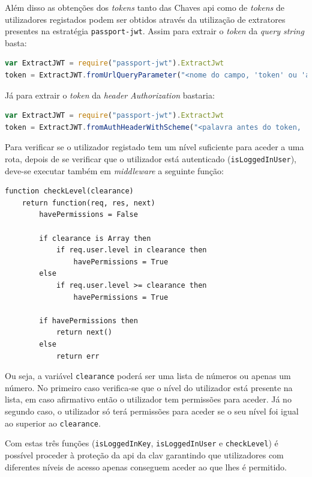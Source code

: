 Além disso as obtenções dos \textit{tokens} tanto das Chaves \acrshort{api} como de \textit{tokens} de utilizadores registados podem ser obtidos através da utilização de extratores presentes na estratégia \texttt{passport-jwt}. Assim para extrair o \textit{token} da \textit{query string} basta:
\begin{lstlisting}[language=javascript, caption=Extração do \textit{token} da \textit{query string}]
var ExtractJWT = require("passport-jwt").ExtractJwt
token = ExtractJWT.fromUrlQueryParameter("<nome do campo, 'token' ou 'apikey' no caso da CLAV>")
\end{lstlisting}
Já para extrair o \textit{token} da \textit{header} \textit{Authorization} bastaria:
\begin{lstlisting}[language=javascript, caption=Extração do \textit{token} da \textit{heaer} \textit{Authorization}]
var ExtractJWT = require("passport-jwt").ExtractJwt
token = ExtractJWT.fromAuthHeaderWithScheme("<palavra antes do token, 'Bearer' no caso dum bearer token, 'token' ou 'apikey' no caso da CLAV>")
\end{lstlisting}

Para verificar se o utilizador registado tem um nível suficiente para aceder a uma rota, depois de se verificar que o utilizador está autenticado (\texttt{isLoggedInUser}), deve-se executar também em \textit{middleware} a seguinte função:
\begin{lstlisting}[language=pseudocode, caption=Verificação se um utilizador registado tem permissões suficientes para aceder a uma determinada rota]
function checkLevel(clearance)
    return function(req, res, next)
        havePermissions = False

        if clearance is Array then
            if req.user.level in clearance then
                havePermissions = True
        else
            if req.user.level >= clearance then
                havePermissions = True
        
        if havePermissions then
            return next()
        else
            return err
\end{lstlisting}
Ou seja, a variável \texttt{clearance} poderá ser uma lista de números ou apenas um número. No primeiro caso verifica-se que o nível do utilizador está presente na lista, em caso afirmativo então o utilizador tem permissões para aceder. Já no segundo caso, o utilizador só terá permissões para aceder se o seu nível foi igual ao superior ao \texttt{clearance}.

Com estas três funções (\texttt{isLoggedInKey}, \texttt{isLoggedInUser} e \texttt{checkLevel}) é possível proceder à proteção da \acrshort{api} da \acrshort{clav} garantindo que utilizadores com diferentes níveis de acesso apenas conseguem aceder ao que lhes é permitido.

